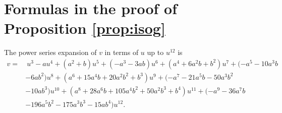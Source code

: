 \documentclass{gtpart}
\theoremstyle{definition}
\theoremstyle{remark}
\begin{document}
\section{Formulas in the proof of Proposition \ref{prop:isog}}
\label{apx:isog}

The power series expansion of $v$ in terms of $u$ up to $u^{12}$ is 
\begin{equation*}
\begin{split}
 v = & ~ u^3 - a u^4 + (a^2 + b) u^5 + (-a^3 - 3 a b) u^6 + (a^4 + 6 a^2 b + b^2) u^7 + (-a^5 - 10 a^3 b \\
     & - 6 a b^2) u^8 + (a^6 + 15 a^4 b + 20 a^2 b^2 + b^3) u^9 + (-a^7 - 21 a^5 b - 50 a^3 b^2 \\
     & - 10 a b^3) u^{10} + (a^8 + 28 a^6 b + 105 a^4 b^2 + 50 a^2 b^3 + b^4) u^{11} + (-a^9 - 36 a^7 b \\
     & - 196 a^5 b^2 - 175 a^3 b^3 - 15 a b^4) u^{12}.  
\end{split}
\end{equation*}
\end{document}

